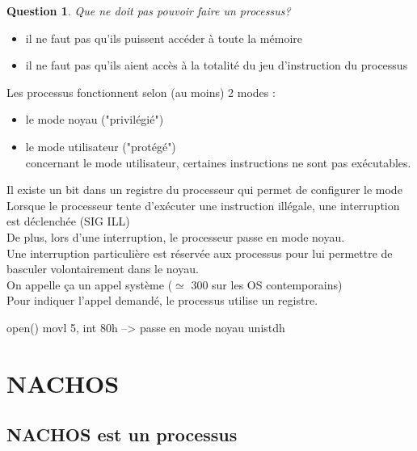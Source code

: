 \documentclass[12pt,a4paper]{report}
\newtheorem*{q}{Question}
\begin{document}
\medskip
\begin{q}Que ne doit pas pouvoir faire un processus?\end{q}
\begin{itemize}
\item il ne faut pas qu'ils puissent accéder à toute la mémoire
\item il ne faut pas qu'ils aient accès à la totalité du jeu d'instruction du processus\\
\end{itemize}

\bigskip

Les processus fonctionnent selon (au moins) 2 modes :
\begin{itemize}
\item le mode noyau ("privilégié")
\item le mode utilisateur ("protégé")\\
concernant le mode utilisateur, certaines instructions ne sont pas exécutables.
\end{itemize}
Il existe un bit dans un registre du processeur qui permet de configurer le mode\\

Lorsque le processeur tente d'exécuter une instruction illégale, une interruption est déclenchée (SIG ILL)\\
De plus, lors d'une interruption, le processeur passe en mode noyau.\\
Une interruption particulière est réservée aux processus pour lui permettre de basculer volontairement dans le noyau.\\
On appelle ça un appel système ($\simeq$ 300 sur les OS contemporains)\\

Pour indiquer l'appel demandé, le processus utilise un registre.
\medskip
\begin{verbatimtab}
open()
{
 movl 5, %
 int 80h      --> passe en mode noyau
}
unistdh
\end{verbatimtab}



\chapter{NACHOS}
\section{NACHOS est un processus}
\end{document}
